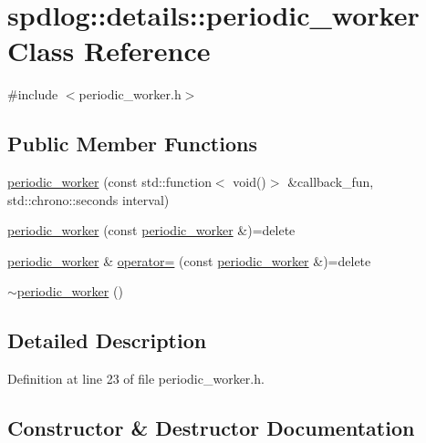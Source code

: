\hypertarget{classspdlog_1_1details_1_1periodic__worker}{}\section{spdlog\+:\+:details\+:\+:periodic\+\_\+worker Class Reference}
\label{classspdlog_1_1details_1_1periodic__worker}


{\ttfamily \#include $<$periodic\+\_\+worker.\+h$>$}

\subsection*{Public Member Functions}
\begin{DoxyCompactItemize}
\item 
\hyperlink{classspdlog_1_1details_1_1periodic__worker_a16ae1b1cb27aa85efbc25a2f055d3523}{periodic\+\_\+worker} (const std\+::function$<$ void()$>$ \&callback\+\_\+fun, std\+::chrono\+::seconds interval)
\item 
\hyperlink{classspdlog_1_1details_1_1periodic__worker_a43b4294bd9a547727864ff18da48b775}{periodic\+\_\+worker} (const \hyperlink{classspdlog_1_1details_1_1periodic__worker}{periodic\+\_\+worker} \&)=delete
\item 
\hyperlink{classspdlog_1_1details_1_1periodic__worker}{periodic\+\_\+worker} \& \hyperlink{classspdlog_1_1details_1_1periodic__worker_a81c0461ef77f85295b93991749df746b}{operator=} (const \hyperlink{classspdlog_1_1details_1_1periodic__worker}{periodic\+\_\+worker} \&)=delete
\item 
\hyperlink{classspdlog_1_1details_1_1periodic__worker_a21168ffd3a91ca2d82fd8959c205a464}{$\sim$periodic\+\_\+worker} ()
\end{DoxyCompactItemize}


\subsection{Detailed Description}


Definition at line 23 of file periodic\+\_\+worker.\+h.



\subsection{Constructor \& Destructor Documentation}
\mbox{\label{classspdlog_1_1details_1_1periodic__worker_a16ae1b1cb27aa85efbc25a2f055d3523}} 
